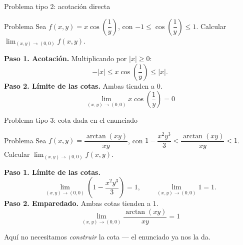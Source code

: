 \documentclass[11pt,aspectratio=169]{beamer}
\begin{document}
\begin{frame}{Problema tipo 2: acotación directa}
  \begin{block}{Problema}
    Sea $f(x,y)=x\cos\!\left(\dfrac1y\right)$, con $-1\le\cos\!\left(\dfrac1y\right)\le 1$. Calcular $\displaystyle\lim_{(x,y)\to(0,0)} f(x,y)$.
  \end{block}
  \pause
  \textbf{Paso 1. Acotación.} Multiplicando por $|x|\ge 0$:
  \[
    -|x|\le x\cos\!\left(\frac1y\right)\le |x|.
  \]
  \pause
  \textbf{Paso 2. Límite de las cotas.} Ambas tienden a $0$.
  \pause
  \[
    \boxed{\lim_{(x,y)\to(0,0)} x\cos\!\left(\frac1y\right)=0}
  \]
\end{frame}

\begin{frame}{Problema tipo 3: cota dada en el enunciado}
  \begin{block}{Problema}
    Sea $f(x,y)=\dfrac{\arctan(xy)}{xy}$, con $1-\dfrac{x^2y^3}{3}<\dfrac{\arctan(xy)}{xy}<1$. Calcular $\displaystyle\lim_{(x,y)\to(0,0)} f(x,y)$.
  \end{block}
  \pause
  \textbf{Paso 1. Límite de las cotas.}
  \[
    \lim_{(x,y)\to(0,0)}\left(1-\frac{x^2y^3}{3}\right)=1,
    \qquad
    \lim_{(x,y)\to(0,0)} 1=1.
  \]
  \pause
  \vspace{-6pt}
  \textbf{Paso 2. Emparedado.} Ambas cotas tienden a $1$.
  \pause
  \vspace{-2pt}
  \[
    \boxed{\lim_{(x,y)\to(0,0)}\frac{\arctan(xy)}{xy}=1}
  \]
  \pause
  \vspace{-4pt}
  \begin{center}\small\color{gray60} Aquí no necesitamos \emph{construir} la cota --- el enunciado ya nos la da.\end{center}
\end{frame}

\end{document}
